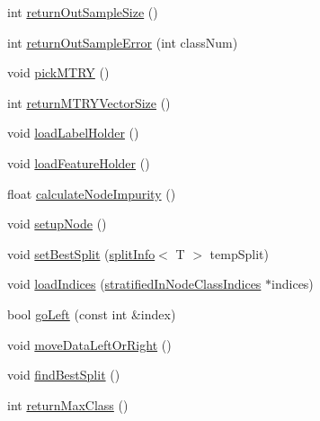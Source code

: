 \begin{DoxyCompactItemize}
\item 
int \hyperlink{classfp_1_1unprocessedNode_a0ebfd763233eeb60b9ee6a803e2dc917}{return\+Out\+Sample\+Size} ()
\item 
int \hyperlink{classfp_1_1unprocessedNode_afbeba7b37bd021e36545af60676f05d5}{return\+Out\+Sample\+Error} (int class\+Num)
\item 
void \hyperlink{classfp_1_1unprocessedNode_a5302bdd3ad2b0de3e2fcd8ed1bf58f61}{pick\+M\+T\+RY} ()
\item 
int \hyperlink{classfp_1_1unprocessedNode_a208170fb33171f64c83839abbf300705}{return\+M\+T\+R\+Y\+Vector\+Size} ()
\item 
void \hyperlink{classfp_1_1unprocessedNode_a7b286c437f8f73fb3431358c11898a82}{load\+Label\+Holder} ()
\item 
void \hyperlink{classfp_1_1unprocessedNode_a8cedeb8c4c88345ff97f9afb89b3ccd0}{load\+Feature\+Holder} ()
\item 
float \hyperlink{classfp_1_1unprocessedNode_a0278b4dd8d905d38d75ced9a95839a12}{calculate\+Node\+Impurity} ()
\item 
void \hyperlink{classfp_1_1unprocessedNode_a713ab68816b13b1a82d667ac6f1640d7}{setup\+Node} ()
\item 
void \hyperlink{classfp_1_1unprocessedNode_ae7ad0b6bf8142ea5d3d851e29b5b9aee}{set\+Best\+Split} (\hyperlink{classfp_1_1splitInfo}{split\+Info}$<$ T $>$ temp\+Split)
\item 
void \hyperlink{classfp_1_1unprocessedNode_af5580595b612e9b3f5ddc4f28c43775c}{load\+Indices} (\hyperlink{classfp_1_1stratifiedInNodeClassIndices}{stratified\+In\+Node\+Class\+Indices} $\ast$indices)
\item 
bool \hyperlink{classfp_1_1unprocessedNode_ad4ffdb4f4b91d6d21f8954f3c80a3617}{go\+Left} (const int \&index)
\item 
void \hyperlink{classfp_1_1unprocessedNode_a0236d2722cb4c32b8ff7e66fc118bed2}{move\+Data\+Left\+Or\+Right} ()
\item 
void \hyperlink{classfp_1_1unprocessedNode_a5fea1583d2250e14470d92568b57e60c}{find\+Best\+Split} ()
\item 
int \hyperlink{classfp_1_1unprocessedNode_af038553809a2e6d1cbe04adaba1c6b21}{return\+Max\+Class} ()
\end{DoxyCompactItemize}
